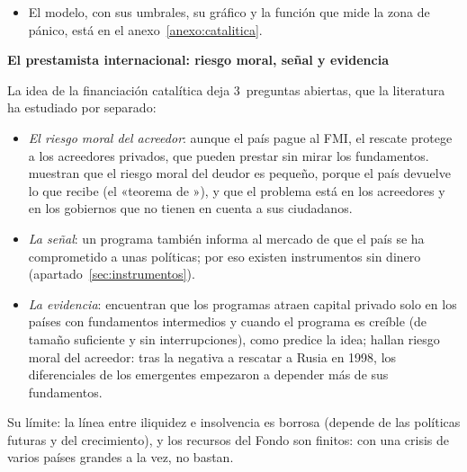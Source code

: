 \documentclass[11pt]{article}
\begin{document}
\begin{itemize}
\begin{itemize}
  \item \emph{no puede salvar a un insolvente}: prestarle solo paga a los acreedores que se van con el dinero del Fondo y deja al país más endeudado. Hace falta reestructurar, y por eso antes de prestar el FMI analiza si la deuda es sostenible (apartado~\ref{sec:dsa});
  \item \emph{el tamaño y la rapidez importan}: un préstamo pequeño o tardío no cambia las expectativas; uno grande, rápido y creíble sí. Es la lógica de las líneas precautorias (apartado~\ref{sec:lineas});
  \item \emph{el riesgo moral no es inevitable}: si el esfuerzo del gobierno mejora los fundamentos, la ayuda puede aumentar su incentivo a esforzarse, porque hace más probable que el esfuerzo evite la crisis; solo un seguro grande e incondicional lo reduce.
  \end{itemize}
\item El modelo, con sus umbrales, su gráfico y la función que mide la zona de pánico, está en el anexo~\ref{anexo:catalitica}.
\end{itemize}

\begin{anotaciones}
\textbf{El prestamista internacional: riesgo moral, señal y evidencia}

La idea de la financiación catalítica deja 3~preguntas abiertas, que la literatura ha estudiado por separado:
\begin{itemize}
\item \emph{El riesgo moral del acreedor}: aunque el país pague al FMI, el rescate protege a los acreedores privados, que pueden prestar sin mirar los fundamentos. \textcite{JeanneZettelmeyer2005} muestran que el riesgo moral del deudor es pequeño, porque el país devuelve lo que recibe (el «teorema de »), y que el problema está en los acreedores y en los gobiernos que no tienen en cuenta a sus ciudadanos.
\item \emph{La señal}: un programa también informa al mercado de que el país se ha comprometido a unas políticas; por eso existen instrumentos sin dinero (apartado~\ref{sec:instrumentos}).
\item \emph{La evidencia}: \textcite{ModySaravia2006} encuentran que los programas atraen capital privado solo en los países con fundamentos intermedios y cuando el programa es creíble (de tamaño suficiente y sin interrupciones), como predice la idea; \textcite{DellAricciaSchnabelZettelmeyer2006} hallan riesgo moral del acreedor: tras la negativa a rescatar a Rusia en 1998, los diferenciales de los emergentes empezaron a depender más de sus fundamentos.
\end{itemize}
Su límite: la línea entre iliquidez e insolvencia es borrosa (depende de las políticas futuras y del crecimiento), y los recursos del Fondo son finitos: con una crisis de varios países grandes a la vez, no bastan.
\end{anotaciones}
\end{document}
